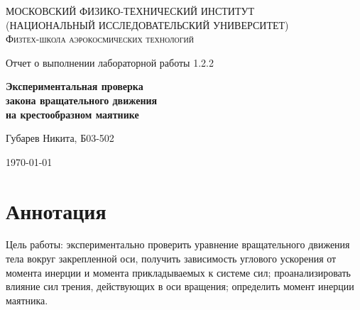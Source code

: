 \documentclass[a4paper]{article}
\begin{document}
\begin{titlepage}
	\centering
	{\scshape\Large МОСКОВСКИЙ ФИЗИКО-ТЕХНИЧЕСКИЙ ИНСТИТУТ \\
	(НАЦИОНАЛЬНЫЙ ИССЛЕДОВАТЕЛЬСКИЙ УНИВЕРСИТЕТ)\\ %
    Физтех-школа аэрокосмических технологий}
	
	\vspace{4cm} %
	{\LARGE Отчет о выполнении лабораторной работы 1.2.2}
	\vspace{1cm} %
	
{\huge\bf Экспериментальная проверка \\ закона вращательного движения  \\ на крестообразном маятнике}
	
	\vspace{1cm} %
	\vfill %
	
    \begin{flushright} %
	   {\LARGE Губарев Никита, Б03-502}
    \end{flushright}
    \vfill 
	\today %
\end{titlepage}
\tableofcontents 
\section{Аннотация}
Цель работы: экспериментально проверить уравнение вращательного движения тела вокруг закрепленной оси, получить зависимость углового ускорения от момента инерции и момента прикладываемых к системе сил; проанализировать влияние сил трения, действующих в оси вращения; определить момент инерции маятника.
\end{document}
